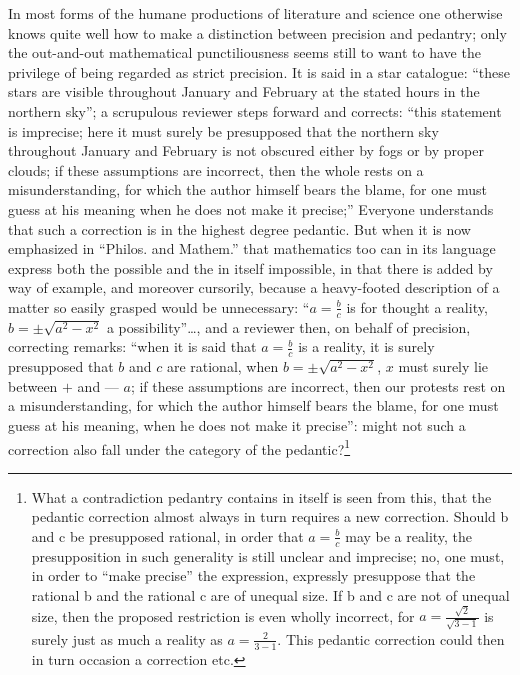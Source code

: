\documentclass[12pt,a4paper,openany]{book}
\newcommand{\opage}[1]{\marginnote{\footnotesize\textit{[#1]}}}
\begin{document}
In most forms of the humane productions of literature and science one otherwise knows quite well how to make
a distinction between precision and pedantry; only the out-and-out mathematical punctiliousness seems still to want to have the privilege of being regarded as strict precision. It is said in
a star catalogue: ``these stars are visible throughout January and
February at the stated hours in the northern sky''; a scrupulous reviewer steps forward and
corrects: ``this statement is imprecise; here it must surely be
presupposed that the northern sky throughout January and
\opage{7}\setcounter{footnote}{0}%
February is not obscured either by fogs
or by proper clouds; if these assumptions are incorrect, then
the whole rests on a misunderstanding, for which the author himself bears the blame, for one must guess at
his meaning when he does not make it precise;'' Everyone understands that such a correction is in the highest degree pedantic.
But when it is now emphasized in ``Philos. and Mathem.'' that
mathematics too can in its language express both the
possible and the in itself impossible, in that there is added by way of example, and
moreover cursorily, because a heavy-footed description of a
matter so easily grasped would be unnecessary:
``$a = \frac{b}{c}$ is for thought a reality, $b = \pm\sqrt{a^{2} - x^{2}}$
a possibility''\dots{}, and a reviewer then, on behalf of precision, correcting remarks: ``when it is said that
$a = \frac{b}{c}$ is a reality, it is surely presupposed that $b$ and $c$ are rational,
when $b = \pm\sqrt{a^{2} - x^{2}}$, $x$ must surely lie between $+$
and --- $a$; if these assumptions are incorrect, then our protests rest on a misunderstanding, for which the author himself
bears the blame, for one must guess at his meaning,
when he does not make it precise'': might not such a correction
also fall under the category of the pedantic?\footnote{What a contradiction pedantry contains in itself is seen from this,
that the pedantic correction almost always in turn requires a new correction. Should b and c be presupposed rational, in order that $a = \frac{b}{c}$ may
be a reality, the presupposition in such generality is still unclear and imprecise; no, one must, in order to ``make precise''
the expression, expressly presuppose that the rational b and the rational c are of unequal size. If b and c are not of unequal size, then
the proposed restriction is even wholly incorrect, for
$a = \frac{\sqrt{2}}{\sqrt{3-1}}$ is surely just as much a reality as $a = \frac{2}{3-1}$.
This pedantic correction could then in turn occasion a correction etc.}
\end{document}
